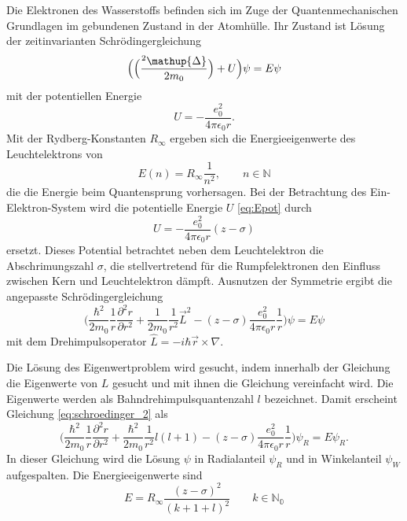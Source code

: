 Die Elektronen des Wasserstoffs befinden sich im Zuge der Quantenmechanischen Grundlagen im gebundenen Zustand in der Atomhülle.
Ihr Zustand ist Lösung der zeitinvarianten Schrödingergleichung
\begin{equation}
	\Bigl(\Bigl(\frac{\hbar^2\mathup{\Delta}}{2 m_0}\Bigr)+U\Bigr)\psi=E\psi
	\label{eq:schroedinger}
\end{equation}
mit der potentiellen Energie 
\begin{equation}
	U=-\frac{e_0^2}{4\pi\epsilon_0 r}.
	\label{eq:Epot}
\end{equation}
Mit der Rydberg-Konstanten $R_\infty$ ergeben sich die Energieeigenwerte des Leuchtelektrons von
\begin{equation}
	E(n)=R_\infty\frac{1}{n^2}, \qquad n\in\mathbb{N}
	\label{eq:EEW}
\end{equation}
die die Energie beim Quantensprung vorhersagen.
Bei der Betrachtung des Ein-Elektron-System wird die potentielle Energie $U$ \eqref{eq:Epot} durch
\begin{equation}
	U=-\frac{e_0^2}{4\pi\epsilon_0 r}(z-\sigma)
	\label{eq:Epot_neu}
\end{equation}
ersetzt.
Dieses Potential betrachtet neben dem Leuchtelektron die Abschrimungszahl $\sigma$, die stellvertretend für die Rumpfelektronen den Einfluss zwischen Kern und Leuchtelektron dämpft.
Ausnutzen der Symmetrie ergibt die angepasste Schrödingergleichung
\begin{equation}
	\biggl(\frac{\hbar^2}{2m_0}\frac{1}{r}\frac{\partial^2 r}{\partial r^2}+\frac{1}{2m_0}\frac{1}{r^2} \vec{L}^2-(z-\sigma)\frac{e_0^2}{4\pi\epsilon_0 r}\frac{1}{r}\biggr)\psi=E\psi
	\label{eq:schroedinger_2}
\end{equation}
mit dem Drehimpulsoperator $\hat{L}=-i\hbar \vec{r}\times\nabla$.

Die Lösung des Eigenwertproblem wird gesucht, indem innerhalb der Gleichung die Eigenwerte von $L$ gesucht und mit ihnen die Gleichung vereinfacht wird.
Die Eigenwerte werden als Bahndrehimpulsquantenzahl $l$ bezeichnet.
Damit erscheint Gleichung \eqref{eq:schroedinger_2} als
\begin{equation}
	\biggl(\frac{\hbar^2}{2m_0}\frac{1}{r}\frac{\partial^2 r}{\partial r^2}+\frac{\hbar^2}{2m_0}\frac{1}{r^2} l(l+1)-(z-\sigma)\frac{e_0^2}{4\pi\epsilon_0 r}\frac{1}{r}\biggr)\psi_R=E\psi_R.
	\label{eq:EEW_drehimpuls_flasche}
\end{equation}
In dieser Gleichung wird die Lösung $\psi$ in Radialanteil $\psi_R$ und in Winkelanteil $\psi_W$ aufgespalten. 
Die Energieeigenwerte sind
\begin{equation}
	E=R_\infty\frac{(z-\sigma)^2}{(k+1+l)^2} \qquad k\in\mathbb{N_0}
	\label{eq:EEW_drehimpuls}
\end{equation}


